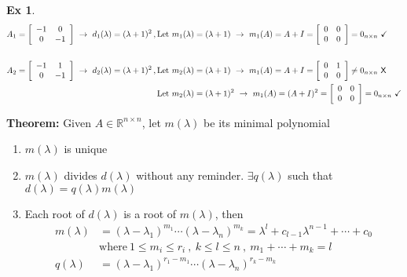 \documentclass[twoside]{article}
\newtheorem{exmp}[theorem]{Ex}
\begin{document}
\begin{exmp}
\begin{align*}
A_1 =   \left[ \begin{array}{cc} -1 & 0  \\ 0 & -1 \end{array} \right] \ \rightarrow \ d_1(\lambda) = (\lambda + 1)^2 \, , \, &\mathrm{Let} \ m_1(\lambda) = (\lambda + 1) \ \rightarrow \ m_1(A) = A + I =  \left[ \begin{array}{cc} 0 & 0  \\ 0 & 0 \end{array} \right] = 0_{n \times n} \ \checkmark
\\
\\
A_2 =   \left[ \begin{array}{cc} -1 & 1  \\ 0 & -1 \end{array} \right] \ \rightarrow \ d_2(\lambda) = (\lambda + 1)^2 \, , \, &\mathrm{Let} \ m_2(\lambda) = (\lambda + 1) \ \rightarrow \ m_1(A) = A + I =  \left[ \begin{array}{cc} 0 & 1  \\ 0 & 0 \end{array} \right] \neq 0_{n \times n} \ \text{\sffamily X}
\\
&\mathrm{Let} \ m_2(\lambda) = (\lambda + 1)^2 \ \rightarrow \ m_1(A) = (A + I)^2 =  \left[ \begin{array}{cc} 0 & 0  \\ 0 & 0 \end{array} \right] = 0_{n \times n} \ \checkmark
\end{align*}
\end{exmp}

\textbf{Theorem:} Given $A \in \mathbb{R}^{n \times n}$, let $m(\lambda)$ be its minimal polynomial 
\begin{enumerate}
	\item $m(\lambda)$ is unique
	\item $m(\lambda)$ divides $d(\lambda)$ without any reminder. $\exists q(\lambda)$ such that $d(\lambda) = q(\lambda) m(\lambda)$ 
	\item Each root of $d(\lambda)$ is a root of $m(\lambda)$, then 
\begin{align*}
m(\lambda) &= (\lambda - \lambda_1)^{m_1} \cdots (\lambda - \lambda_n)^{m_k} = \lambda^l + c_{l-1} \lambda^{n-1} + \cdots + c_0 
\\
&\mathrm{where} \ 1 \leq m_i \leq r_i \ , \ k \leq l \leq n \ , \ m_1 + \cdots + m_k = l
\\
q(\lambda) &= (\lambda - \lambda_1)^{r_1-m_1} \cdots (\lambda - \lambda_n)^{r_k-m_k} 
\end{align*}
\end{enumerate}
\end{document}
